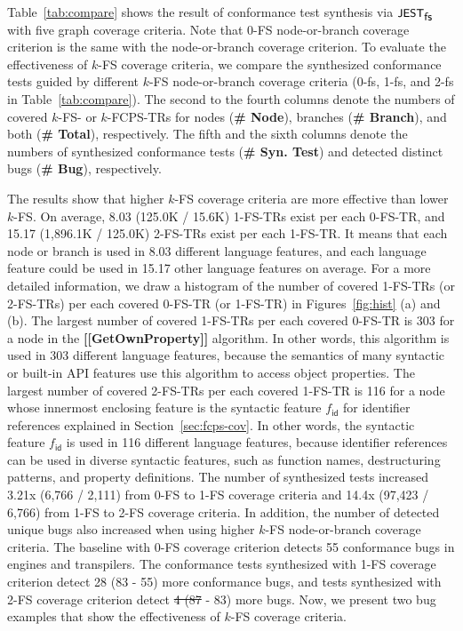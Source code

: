 \documentclass[acmsmall,review,screen]{acmart}
\newcommand{\name}[1]{\textsf{#1}}
\newcommand{\sname}[1]{\name{\small #1}}
\newcommand{\jest}{\sname{JEST}}
\newcommand{\tool}{\jest_{\sname{fs}}}
\newcommand{\feat}{f}
\newcommand{\idfeat}{\feat_{\name{id}}}
\providecommand{\DIFaddtex}[1]{{\protect\color{blue}\uwave{#1}}} %
\providecommand{\DIFdeltex}[1]{{\protect\color{red}\sout{#1}}}                      %
\providecommand{\DIFaddbegin}{} %
\providecommand{\DIFaddend}{} %
\providecommand{\DIFdelbegin}{} %
\providecommand{\DIFdelend}{} %
\providecommand{\DIFadd}[1]{\texorpdfstring{\DIFaddtex{#1}}{#1}} %
\providecommand{\DIFdel}[1]{\texorpdfstring{\DIFdeltex{#1}}{}} %
\newcommand{\DIFscaledelfig}{0.5}
\newlength{\DIFdelgraphicswidth} %
\newlength{\DIFdelgraphicsheight} %
\newcommand{\DIFaddincludegraphics}[2][]{{\color{blue}\fbox{\DIFOincludegraphics[#1]{#2}}}} %
\newcommand{\DIFdelincludegraphics}[2][]{%
\sbox{\DIFdelgraphicsbox}{\DIFOincludegraphics[#1]{#2}}%
\settoboxwidth{\DIFdelgraphicswidth}{\DIFdelgraphicsbox} %
\settoboxtotalheight{\DIFdelgraphicsheight}{\DIFdelgraphicsbox} %
\scalebox{\DIFscaledelfig}{%
\parbox[b]{\DIFdelgraphicswidth}{\usebox{\DIFdelgraphicsbox}\\[-\baselineskip] \rule{\DIFdelgraphicswidth}{0em}}\llap{\resizebox{\DIFdelgraphicswidth}{\DIFdelgraphicsheight}{%
\setlength{\unitlength}{\DIFdelgraphicswidth}%
\begin{picture}(1,1)%
\thicklines\linethickness{2pt} %
{\color[rgb]{1,0,0}\put(0,0){\framebox(1,1){}}}%
{\color[rgb]{1,0,0}\put(0,0){\line( 1,1){1}}}%
{\color[rgb]{1,0,0}\put(0,1){\line(1,-1){1}}}%
\end{picture}%
}\hspace*{3pt}}} %
} %
\DeclareRobustCommand{\DIFaddbegin}{\DIFOaddbegin \let\includegraphics\DIFaddincludegraphics} %
\DeclareRobustCommand{\DIFaddend}{\DIFOaddend \let\includegraphics\DIFOincludegraphics} %
\DeclareRobustCommand{\DIFdelbegin}{\DIFOdelbegin \let\includegraphics\DIFdelincludegraphics} %
\DeclareRobustCommand{\DIFdelend}{\DIFOaddend \let\includegraphics\DIFOincludegraphics} %
\begin{document}

Table~\ref{tab:compare} shows the result of conformance test synthesis via
$\tool$ with five graph coverage criteria.
%
Note that 0-FS node-or-branch coverage criterion is the same with the node-or-branch
coverage criterion.
%
To evaluate the effectiveness of $k$-FS coverage criteria, we compare the synthesized
conformance tests guided by different $k$-FS node-or-branch coverage criteria
(\sname{0-fs}, \sname{1-fs}, and \sname{2-fs} in Table~\ref{tab:compare}).
%
The second to the fourth columns denote the numbers of covered $k$-FS- or $k$-FCPS-TRs for
nodes (\textbf{\small \# Node}), branches (\textbf{\small \# Branch}), and both
(\textbf{\small \# Total}), respectively.
%
The fifth and the sixth columns denote the numbers of synthesized conformance tests
(\textbf{\small\# Syn. Test}) and detected distinct bugs
(\textbf{\small\# Bug}), respectively.


The results show that higher $k$-FS coverage criteria are more
effective than lower $k$-FS.
On average, 8.03 (125.0K / 15.6K) 1-FS-TRs exist per each 0-FS-TR, and 15.17 (1,896.1K
/ 125.0K) 2-FS-TRs exist per each 1-FS-TR.
%
It means that each node or branch is used in 8.03 different language features,
and each language feature could be used in 15.17 other language features on average.
%
For a more detailed information, we draw a histogram of the number of covered
1-FS-TRs (or 2-FS-TRs) per each covered 0-FS-TR (or 1-FS-TR) in
Figures~\ref{fig:hist} (a) and (b).
%
The largest number of covered 1-FS-TRs per each covered 0-FS-TR is 303
for a node in the \textbf{[[GetOwnProperty]]} algorithm.
%
In other words, this algorithm is used in 303 different language features,
because the semantics of many syntactic or built-in API features use
this algorithm to access object properties.
%
The largest number of covered 2-FS-TRs per each covered 1-FS-TR is 116
for a node whose innermost enclosing feature is the syntactic feature $\idfeat$
for identifier references explained in Section~\ref{sec:fcps-cov}.
%
In other words, the syntactic feature $\idfeat$ is used in 116 different
language features, because identifier references can be used in
diverse syntactic features, such as function names, destructuring
patterns, and property definitions.
%
The number of synthesized tests increased 3.21x (6,766 / 2,111) from 0-FS to
1-FS coverage criteria and 14.4x (97,423 / 6,766) from 1-FS to 2-FS coverage
criteria.
%
In addition, the number of detected unique bugs also increased when using higher
$k$-FS node-or-branch coverage criteria.
%
The baseline with 0-FS coverage criterion detects 55 conformance bugs in engines
and transpilers.
%
The conformance tests synthesized with 1-FS coverage criterion detect 28
(83 - 55) more conformance bugs, and tests synthesized with 2-FS coverage
criterion detect \DIFdelbegin \DIFdel{4 (87 }\DIFdelend \DIFaddbegin \DIFadd{19 (102 }\DIFaddend - 83) more bugs.
%
Now, we present two bug examples that show the effectiveness of $k$-FS coverage
criteria.
\end{document}
